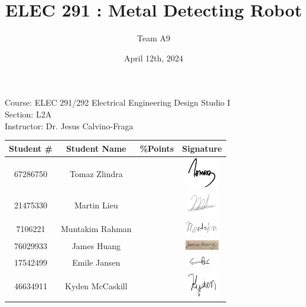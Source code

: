 \documentclass{article}
\title{ELEC 291 : Metal Detecting Robot}
\author{Team A9}
\date{April 12th, 2024}
\begin{document}
\maketitle
\begin{center}
Course: ELEC 291/292 Electrical Engineering Design Studio I \\
Section: L2A \\
Instructor: Dr. Jesus Calvino-Fraga \\
\end{center}

\begin{center}
\begin{tabular}{|c|c|c|c|}
    \hline
    Student \# & Student Name & \%Points & Signature \\
    \hline
    67286750 & Tomaz Zlindra &  & \includegraphics[width = 1.5cm]{Names/Tomaz.jpeg}  \\
    \hline
    21475330 & Martin Lieu &  &
    \includegraphics[width=1.5cm]{Names/Martin.png} \\
    \hline
    7106221 & Muntakim Rahman &  & \includegraphics[width=1.5cm]{Names/Muntakim.png} \\
    \hline
    76029933 & James Huang &  & \includegraphics[width = 1.5cm]{Names/James.jpeg}\\
    \hline
    17542499 & Emile Jansen  &  & \includegraphics[width = 1.5cm]{Names/Emile.png} \\
    \hline
    46634911 & Kyden McCaskill &  & \includegraphics[width=1.5cm]{Names/Kyden.png}\\
    \hline
\end{tabular}
\end{center}
\end{document}
